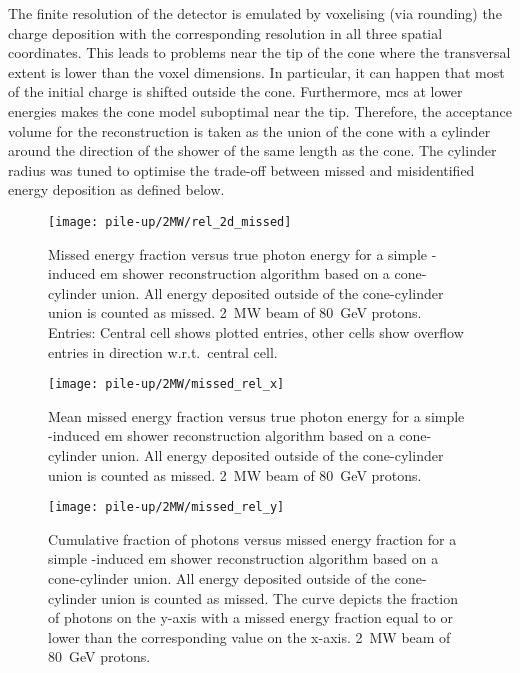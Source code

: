 The finite resolution of the detector is emulated by voxelising (via rounding) the charge deposition with the corresponding resolution in all three spatial coordinates.
This leads to problems near the tip of the cone where the transversal extent is lower than the voxel dimensions.
In particular, it can happen that most of the initial charge is shifted outside the cone.
Furthermore, \gls{mcs} at lower energies makes the cone model suboptimal near the tip.
Therefore, the acceptance volume for the reconstruction is taken as the union of the cone with a cylinder around the direction of the shower of the same length as the cone.
The cylinder radius was tuned to optimise the trade-off between missed and misidentified energy deposition as defined below.

\begin{figure}[htb]
	\centering
	\texttt{[image: pile-up/2MW/rel\_2d\_missed]}
	\caption[Pile-up study missed fractional vs.\ true photon energy, \SI{2}{\mega\watt} beam]{%
		Missed energy fraction versus true photon energy for a simple \Pgpz-induced \acrshort{em} shower reconstruction algorithm based on a cone-cylinder union.
		All energy deposited outside of the cone-cylinder union is counted as missed.
		\SI{2}{\mega\watt} beam of \SI{80}{\giga\electronvolt} protons.
		Entries: Central cell shows plotted entries, other cells show overflow entries in direction w.r.t.\ central cell.
	}
	\label{fig:dune-nd_2MW_rel-2d-missed}
\end{figure}

\begin{figure}[htb]
	\centering
	\texttt{[image: pile-up/2MW/missed\_rel\_x]}
	\caption[Pile-up study mean missed fractional vs.\ true photon energy, \SI{2}{\mega\watt} beam]{%
		Mean missed energy fraction versus true photon energy for a simple \Pgpz-induced \acrshort{em} shower reconstruction algorithm based on a cone-cylinder union.
		All energy deposited outside of the cone-cylinder union is counted as missed.
		\SI{2}{\mega\watt} beam of \SI{80}{\giga\electronvolt} protons.
	}
	\label{fig:dune-nd_2MW_missed-rel-x}
\end{figure}

\begin{figure}[htb]
	\centering
	\texttt{[image: pile-up/2MW/missed\_rel\_y]}
	\caption[Pile-up study photon vs.\ missed energy fraction, \SI{2}{\mega\watt} beam]{%
		Cumulative fraction of photons versus missed energy fraction for a simple \Pgpz-induced \acrshort{em} shower reconstruction algorithm based on a cone-cylinder union.
		All energy deposited outside of the cone-cylinder union is counted as missed.
		The curve depicts the fraction of photons on the y-axis with a missed energy fraction equal to or lower than the corresponding value on the x-axis.
		\SI{2}{\mega\watt} beam of \SI{80}{\giga\electronvolt} protons.
	}
	\label{fig:dune-nd_2MW_missed-rel-y}
\end{figure}

